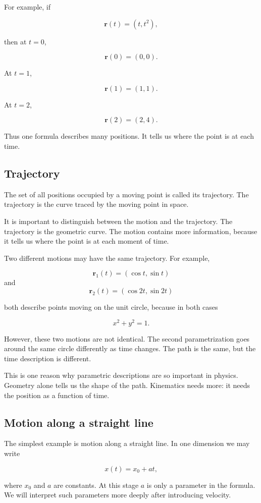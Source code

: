 For example, if

\[
\mathbf{r}(t) = (t,t^2),
\]

then at \(t=0\),

\[
\mathbf{r}(0) = (0,0).
\]

At \(t=1\),

\[
\mathbf{r}(1) = (1,1).
\]

At \(t=2\),

\[
\mathbf{r}(2) = (2,4).
\]

Thus one formula describes many positions. It tells us where the point is at each time.

\subsection{Trajectory}

The set of all positions occupied by a moving point is called its trajectory. The trajectory is the curve traced by the moving point in space.

It is important to distinguish between the motion and the trajectory. The trajectory is the geometric curve. The motion contains more information, because it tells us where the point is at each moment of time.

Two different motions may have the same trajectory. For example,

\[
\mathbf{r}_1(t) = (\cos t,\sin t)
\]
and
\[
\mathbf{r}_2(t) = (\cos 2t,\sin 2t)
\]

both describe points moving on the unit circle, because in both cases

\[
x^2+y^2 = 1.
\]

However, these two motions are not identical. The second parametrization goes around the same circle differently as time changes. The path is the same, but the time description is different.

This is one reason why parametric descriptions are so important in physics. Geometry alone tells us the shape of the path. Kinematics needs more: it needs the position as a function of time.

\subsection{Motion along a straight line}

The simplest example is motion along a straight line. In one dimension we may write

\[
x(t) = x_0 + at,
\]

where \(x_0\) and \(a\) are constants. At this stage \(a\) is only a parameter in the formula. We will interpret such parameters more deeply after introducing velocity.

